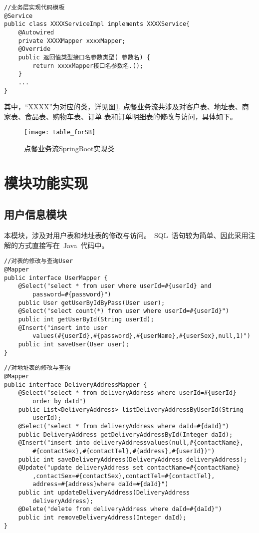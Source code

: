 \begin{lstlisting}[basicstyle=\footnotesize]
//业务层实现代码模板
@Service
public class XXXXServiceImpl implements XXXXService{
    @Autowired
    private XXXXMapper xxxxMapper;
    @Override
    public 返回值类型接口名参数类型( 参数名) {
        return xxxxMapper接口名参数名.();
    }
    ...
}
\end{lstlisting}

其中，“XXXX”为对应的类，详见图\ref{fig:table_forSB}.
点餐业务流共涉及对客户表、地址表、商家表、食品表、购物车表、订单
表和订单明细表的修改与访问，具体如下。

\begin{figure}[htbp]
    \centering
    \texttt{[image: table\_forSB]}
    \caption{点餐业务流SpringBoot实现类}\label{fig:table_forSB}
    \vspace{\baselineskip}
\end{figure}

\section{模块功能实现}
\subsection{用户信息模块}
本模块，涉及对用户表和地址表的修改与访问。~SQL~语句较为简单、因此采用注解的方式直接写在~Java~代码中。

\begin{lstlisting}[basicstyle=\footnotesize]
//对表的修改与查询User
@Mapper
public interface UserMapper {
    @Select("select * from user where userId=#{userId} and
        password=#{password}")
    public User getUserByIdByPass(User user);
    @Select("select count(*) from user where userId=#{userId}")
    public int getUserById(String userId);
    @Insert("insert into user
        values(#{userId},#{password},#{userName},#{userSex},null,1)")
    public int saveUser(User user);
}
\end{lstlisting}


\begin{lstlisting}[basicstyle=\footnotesize]
//对地址表的修改与查询
@Mapper
public interface DeliveryAddressMapper {
    @Select("select * from deliveryAddress where userId=#{userId} 
        order by daId")
    public List<DeliveryAddress> listDeliveryAddressByUserId(String
        userId);
    @Select("select * from deliveryAddress where daId=#{daId}")
    public DeliveryAddress getDeliveryAddressById(Integer daId);
    @Insert("insert into deliveryAddressvalues(null,#{contactName},
        #{contactSex},#{contactTel},#{address},#{userId})")
    public int saveDeliveryAddress(DeliveryAddress deliveryAddress);
    @Update("update deliveryAddress set contactName=#{contactName}
        ,contactSex=#{contactSex},contactTel=#{contactTel},
        address=#{address}where daId=#{daId}")
    public int updateDeliveryAddress(DeliveryAddress 
        deliveryAddress);
    @Delete("delete from deliveryAddress where daId=#{daId}")
    public int removeDeliveryAddress(Integer daId);
}
\end{lstlisting}

